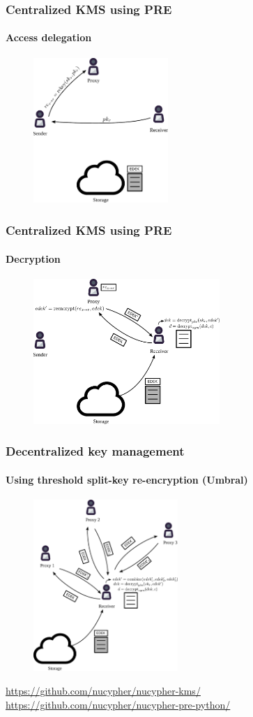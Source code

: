 \documentclass[xetex,mathsans,sans]{beamer}
\begin{document}
    \begin{frame}
        \frametitle{Centralized KMS using PRE}
        \framesubtitle{Access delegation}
        \begin{figure}
            \centering
            \includegraphics[height=5.5cm]{pdf/delegate.pdf}
        \end{figure}
    \end{frame}

    \begin{frame}
        \frametitle{Centralized KMS using PRE}
        \framesubtitle{Decryption}
        \begin{figure}
            \centering
            \includegraphics[height=5.5cm]{pdf/decrypt.pdf}
        \end{figure}
    \end{frame}

    \begin{frame}
        \frametitle{Decentralized key management}
        \framesubtitle{Using threshold split-key re-encryption (Umbral)}
        \begin{figure}
            \centering
            \includegraphics[height=6.5cm]{pdf/decrypt-umbral.pdf}
        \end{figure}
        \url{https://github.com/nucypher/nucypher-kms/}
        \url{https://github.com/nucypher/nucypher-pre-python/}
    \end{frame}
\end{document}
